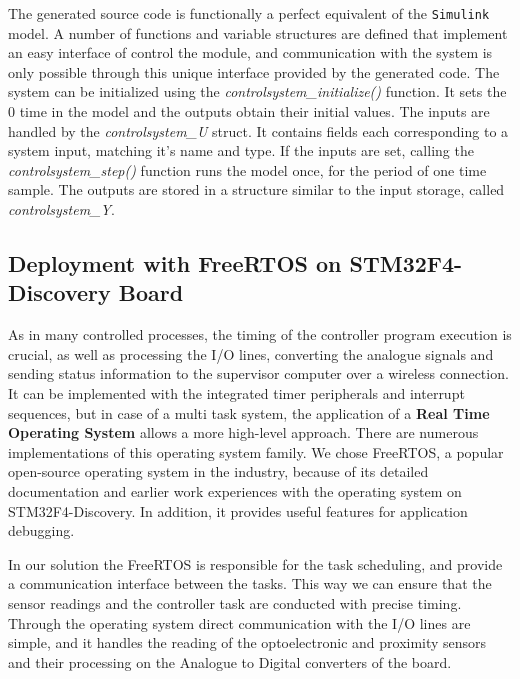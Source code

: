 The generated source code is functionally a perfect equivalent of the \verb!Simulink! model. A number of functions and variable structures are defined that implement an easy interface of control the module, and communication with the system is only possible through this unique interface provided by the generated code. The system can be initialized using the \emph{controlsystem\_initialize()} function. It sets the 0 time in the model and the outputs obtain their initial values. The inputs are handled by the \emph{controlsystem\_U} struct. It contains fields each corresponding to a system input, matching it's name and type. If the inputs are set, calling the \emph{controlsystem\_step()} function runs the model once, for the period of one time sample. The outputs are stored in a structure similar to the input storage, called \emph{controlsystem\_Y}.

\subsection{Deployment with FreeRTOS on STM32F4-Discovery Board}

As in many controlled processes, the timing of the controller program execution is crucial, as well as processing the I/O lines, converting the analogue signals and sending status information to the supervisor computer over a wireless connection. It can be implemented with the integrated timer peripherals and interrupt sequences, but in case of a multi task system, the application of a \textbf{Real Time Operating System} allows a more high-level approach. There are numerous implementations of this operating system family. We chose FreeRTOS, a popular open-source operating system in the industry, because of its detailed documentation and earlier work experiences with the operating system on STM32F4-Discovery. In addition, it provides useful features for application debugging.

In our solution the FreeRTOS is responsible for the task scheduling, and provide a communication interface between the tasks. This way we can ensure that the sensor readings and the controller task are conducted with precise timing. Through the operating system direct communication with the I/O lines are simple, and it handles the reading of the optoelectronic and proximity sensors and their processing on the Analogue to Digital converters of the board.

